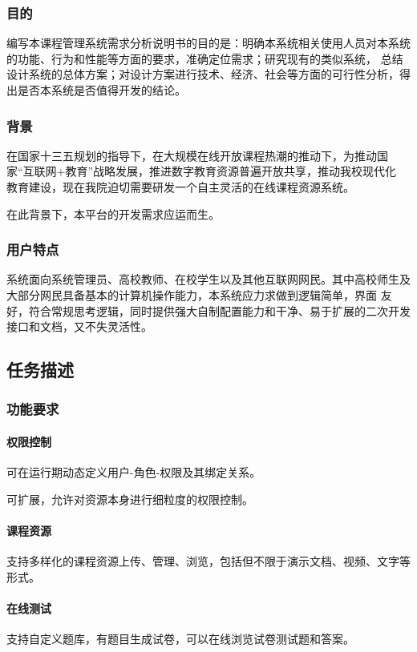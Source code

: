 \documentclass[titlepage,UTF8,linespread=1.5]{ctexart}
\begin{document}
\subsubsection{目的}
编写本课程管理系统需求分析说明书的目的是：明确本系统相关使用人员对本系统的功能、行为和性能等方面的要求，准确定位需求；研究现有的类似系统，
总结设计系统的总体方案；对设计方案进行技术、经济、社会等方面的可行性分析，得出是否本系统是否值得开发的结论。\par
\subsubsection{背景}
在国家十三五规划的指导下，在大规模在线开放课程热潮的推动下，为推动国家“互联网+教育”战略发展，推进数字教育资源普遍开放共享，推动我校现代化
教育建设，现在我院迫切需要研发一个自主灵活的在线课程资源系统。\par
在此背景下，本平台的开发需求应运而生。\par
\subsubsection{用户特点}
系统面向系统管理员、高校教师、在校学生以及其他互联网网民。其中高校师生及大部分网民具备基本的计算机操作能力，本系统应力求做到逻辑简单，界面
友好，符合常规思考逻辑，同时提供强大自制配置能力和干净、易于扩展的二次开发接口和文档，又不失灵活性。\par

\subsection{任务描述}
\subsubsection{功能要求}
\paragraph{权限控制}
可在运行期动态定义用户-角色-权限及其绑定关系。\par
可扩展，允许对资源本身进行细粒度的权限控制。\par

\paragraph{课程资源}
支持多样化的课程资源上传、管理、浏览，包括但不限于演示文档、视频、文字等形式。\par
\paragraph{在线测试}
支持自定义题库，有题目生成试卷，可以在线浏览试卷测试题和答案。\par
\end{document}
